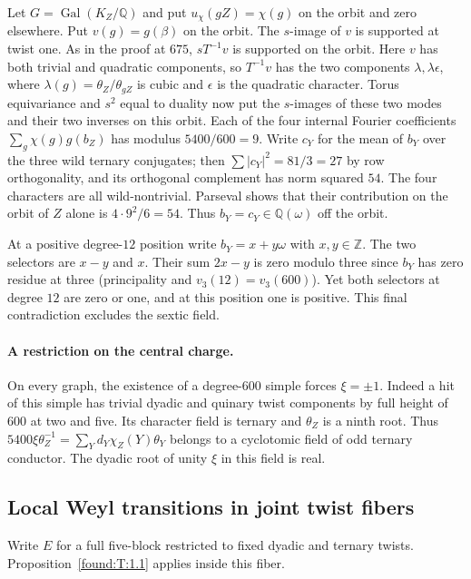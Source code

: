 \documentclass[11pt,a4paper]{article}
\numberwithin{equation}{section}
\theoremstyle{remark}
\newcommand{\ZZ}{\mathbb Z}
\newcommand{\QQ}{\mathbb Q}
\begin{document}
Let $G=\operatorname{Gal}(K_Z/\QQ)$ and put $u_\chi(gZ)=\chi(g)$ on the orbit and zero elsewhere. Put $v(g)=g(\beta)$ on the orbit. The $s$-image of $v$ is supported at twist one. As in the proof at $675$, $sT^{-1}v$ is supported on the orbit. Here $v$ has both trivial and quadratic components, so $T^{-1}v$ has the two components $\lambda,\lambda\epsilon$, where $\lambda(g)=\theta_Z/\theta_{gZ}$ is cubic and $\epsilon$ is the quadratic character. Torus equivariance and $s^2$ equal to duality now put the $s$-images of these two modes and their two inverses on this orbit. Each of the four internal Fourier coefficients $\sum_g\chi(g)g(b_Z)$ has modulus $5400/600=9$. Write $c_Y$ for the mean of $b_Y$ over the three wild ternary conjugates; then $\sum|c_Y|^2=81/3=27$ by row orthogonality, and its orthogonal complement has norm squared $54$. The four characters are all wild-nontrivial. Parseval shows that their contribution on the orbit of $Z$ alone is $4\cdot9^2/6=54$. Thus $b_Y=c_Y\in\QQ(\omega)$ off the orbit.

At a positive degree-$12$ position write $b_Y=x+y\omega$ with $x,y\in\ZZ$. The two selectors are $x-y$ and $x$. Their sum $2x-y$ is zero modulo three since $b_Y$ has zero residue at three (principality and $v_3(12)=v_3(600)$). Yet both selectors at degree $12$ are zero or one, and at this position one is positive. This final contradiction excludes the sextic field.

\paragraph{A restriction on the central charge.}
On every graph, the existence of a degree-$600$ simple forces $\xi=\pm1$.
Indeed a hit of this simple has trivial dyadic and quinary twist components by full height of $600$ at two and five. Its character field is ternary and $\theta_Z$ is a ninth root. Thus $5400\xi\theta_Z^{-1}=\sum_Yd_Y\chi_Z(Y)\theta_Y$ belongs to a cyclotomic field of odd ternary conductor. The dyadic root of unity $\xi$ in this field is real.


\subsection{Local Weyl transitions in joint twist fibers}
\label{por:sec:jointfibers}
Write $E$ for a full five-block restricted to fixed dyadic and ternary twists. Proposition~\ref{found:T:1.1} applies inside this fiber.
\end{document}
